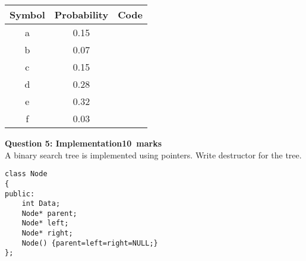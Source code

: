 \documentclass[12pt,a4paper]{article}
\def\Qfive{10}
\def\SingleSpacing{\def\baselinestretch{1}\large\normalsize}
\begin{document}
\begin{table}[H]
\begin{center}
\vspace{0.3cm}
\SingleSpacing
	\begin{tabular}{ccc}
	\hline \hline
		\rule{0pt}{2.6ex}\textbf{Symbol} & \textbf{Probability} & \textbf{Code}\\
		\hline
		\rule{0pt}{2.6ex}a & 0.15 & \\
		b& 0.07 & \\
		c& 0.15 & \\
		d& 0.28 & \\
		e& 0.32 & \\
		f& 0.03 & \\
	\hline \hline
	\end{tabular}
\end{center}
\end{table}
\newpage
\noindent\textbf{Question 5: Implementation\hfill \Qfive~marks}\\
A binary search tree is implemented using pointers. Write destructor for the tree. 
\begin{lstlisting}
class Node
{
public:
	int Data;
	Node* parent;
	Node* left;
	Node* right;
	Node() {parent=left=right=NULL;}
};
\end{lstlisting}
\end{document}
